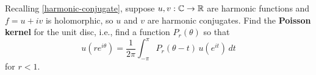 \documentclass{homework}
\begin{document}
                                                                                                                  \begin{problem}
                                                                                                                     Recalling \ref{harmonic-conjugate}, suppose $u, v : \mathbb{C} \to \mathbb{R}$ are
                                                                                                                        harmonic functions and $f = u + iv$ is holomorphic, so $u$ and $v$
                                                                                                                           are harmonic conjugates.  Find the \textbf{Poisson kernel} for the
                                                                                                                              unit disc, i.e., find a function $P_r(\theta)$ so that
                                                                                                                                 \[
                                                                                                                                      u(re^{i\theta}) = \frac {1}{2\pi} \int_{-\pi }^{\pi } P_{r}(\theta -t) \, u(e^{it}) \, dt
                                                                                                                                         \]
                                                                                                                                            for $r < 1$.
                                                                                                                                             \end{problem}
\end{document}
